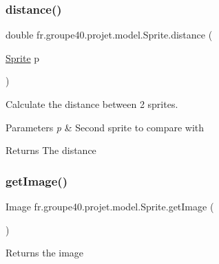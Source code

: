 \subsubsection{\texorpdfstring{distance()}{distance()}\hspace{0.1cm}{\footnotesize\ttfamily [3/3]}}
{\footnotesize\ttfamily double fr.\+groupe40.\+projet.\+model.\+Sprite.\+distance (\begin{DoxyParamCaption}\item[{\mbox{\hyperlink{classfr_1_1groupe40_1_1projet_1_1model_1_1_sprite}{Sprite}}}]{p }\end{DoxyParamCaption})}



Calculate the distance between 2 sprites. 


\begin{DoxyParams}{Parameters}
{\em p} & Second sprite to compare with \\
\hline
\end{DoxyParams}
\begin{DoxyReturn}{Returns}
The distance 
\end{DoxyReturn}
\mbox{\label{classfr_1_1groupe40_1_1projet_1_1model_1_1_sprite_ae978c58649b232749722a2c2c86e1f0d}} 
\subsubsection{\texorpdfstring{get\+Image()}{getImage()}}
{\footnotesize\ttfamily Image fr.\+groupe40.\+projet.\+model.\+Sprite.\+get\+Image (\begin{DoxyParamCaption}{ }\end{DoxyParamCaption})}

\begin{DoxyReturn}{Returns}
the image 
\end{DoxyReturn}
\mbox{\label{classfr_1_1groupe40_1_1projet_1_1model_1_1_sprite_a208906f75c02531120b4d0c78c59e7f9}} 
